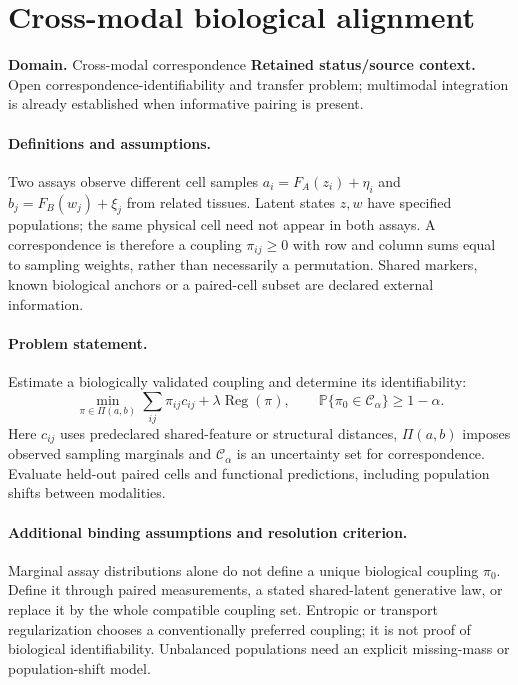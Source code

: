 \documentclass[11pt]{article}
\begin{document}
\section*{Cross-modal biological alignment}
\label{prob:078}
\label{rank:301}
\par\smallskip

\noindent\textbf{Domain.} Cross-modal correspondence \quad \textbf{Retained status/source context.} Open correspondence-identifiability and transfer problem; multimodal integration is already established when informative pairing is present.
\paragraph{Definitions and assumptions.} Two assays observe different cell samples $a_i=F_A(z_i)+\eta_i$ and $b_j=F_B(w_j)+\xi_j$ from related tissues. Latent states $z,w$ have specified populations; the same physical cell need not appear in both assays. A correspondence is therefore a coupling $\pi_{ij}\ge0$ with row and column sums equal to sampling weights, rather than necessarily a permutation. Shared markers, known biological anchors or a paired-cell subset are declared external information.
\paragraph{Problem statement.} Estimate a biologically validated coupling and determine its identifiability:
\[\min_{\pi\in\Pi(a,b)}\sum_{ij}\pi_{ij}c_{ij}+\lambda\operatorname{Reg}(\pi),\qquad \mathbb{P}\{\pi_0\in\mathcal C_\alpha\}\ge1-\alpha.\]
Here $c_{ij}$ uses predeclared shared-feature or structural distances, $\Pi(a,b)$ imposes observed sampling marginals and $\mathcal C_\alpha$ is an uncertainty set for correspondence. Evaluate held-out paired cells and functional predictions, including population shifts between modalities.
\paragraph{Additional binding assumptions and resolution criterion.} Marginal assay distributions alone do not define a unique biological coupling $\pi_0$. Define it through paired measurements, a stated shared-latent generative law, or replace it by the whole compatible coupling set. Entropic or transport regularization chooses a conventionally preferred coupling; it is not proof of biological identifiability. Unbalanced populations need an explicit missing-mass or population-shift model.
\end{document}
